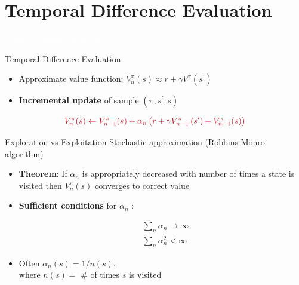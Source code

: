 \documentclass[11pt,table]{beamer}
\begin{document}
\section{Temporal Difference Evaluation}
{
\begin{frame}
\centering
\Huge
\textcolor{white}{Temporal Difference Evaluation}
\thispagestyle{empty}
\end{frame}
}


\begin{frame}{Temporal Difference Evaluation}


\begin{itemize}
    \item Approximate value function: $V_{n}^{\pi}(s) \approx r+\gamma V^{\pi}\left(s^{\prime}\right)$
		
		\item \textbf{Incremental update} of sample $\left(\pi, s^{\prime}, s\right)$
   \end{itemize} 

$$
\textcolor{red1}{V_{n}^{\pi}(s) \leftarrow V_{n-1}^{\pi}(s)+\alpha_{n}\left(r+\gamma V_{n-1}^{\pi}\left(s^{\prime}\right)-V_{n-1}^{\pi}(s)\right)}
$$
\end{frame}

\begin{frame}{Exploration vs Exploitation}
Stochastic approximation (Robbins-Monro algorithm)
\begin{itemize}

\item \textbf{Theorem}: If $\alpha_{n}$ is appropriately decreased with number of times a state is visited then $V_{n}^{\pi}(s)$ converges to correct value

\item \textbf{Sufficient conditions} for $\alpha_{n}$ :


\begin{align}
&  \sum_{n} \alpha_{n} \rightarrow \infty \\
& \sum_{n} \alpha^2_{n} < \infty
\end{align}

\item \text Often $\alpha_{n}(s)=1 / n(s)$,\\
where $n(s)=$ \# of times $s$ is visited 
   \end{itemize} 
\end{frame}
\end{document}
